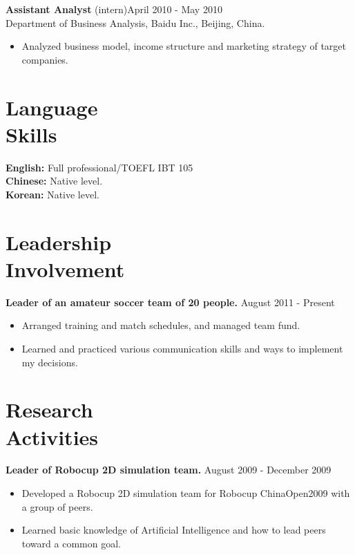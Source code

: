 \documentclass[margin]{res}
\begin{document}
\begin{resume}
                {\bf Assistant Analyst} (intern)\hfill            April 2010 - May 2010 \\
                Department of Business Analysis, Baidu Inc., Beijing, China. 
                 \begin{itemize}  \itemsep -2pt %
                 \item Analyzed business model, income structure and marketing strategy of target companies.
                 \end{itemize} 

 \section{Language \\ Skills} 
				{\bf English:} Full professional/TOEFL IBT 105\\
				{\bf Chinese:} Native level.\\
				{\bf Korean: } Native level.	\\	 
 
 \section{Leadership \\ Involvement} 
				{ \bf Leader of an amateur soccer team of 20 people.} \hfill August 2011 - Present \\           
                 \begin{itemize}  \itemsep -2pt %
                 \item Arranged training and match schedules, and managed team fund. 
                \item  Learned and practiced various communication skills and ways to implement my decisions.
                \end{itemize}

\section{Research \\ Activities} 
				{ \bf Leader of Robocup 2D simulation team.} \hfill August 2009 - December 2009 \\  								
                 \begin{itemize}  \itemsep -2pt %
                 \item Developed a Robocup 2D simulation team for Robocup ChinaOpen2009 with a group of peers. 
                \item  Learned basic knowledge of Artificial Intelligence and how to lead peers toward a common goal.
                \end{itemize}


\end{resume}
\end{document}
